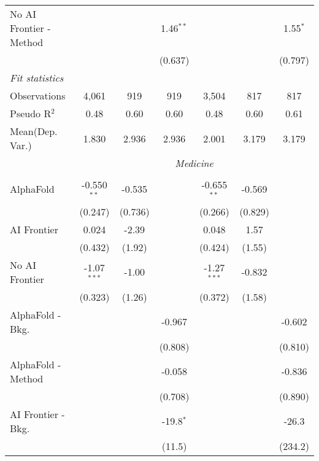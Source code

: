 \begin{tabular}{lcccccc}
   No AI Frontier - Method &               &             & 1.46$^{**}$  &               &             & 1.55$^{*}$\\   
                           &               &             & (0.637)      &               &             & (0.797)\\   
   \midrule
   \emph{Fit statistics}\\
   Observations            & 4,061         & 919         & 919          & 3,504         & 817         & 817\\  
   Pseudo R$^2$            & 0.48          & 0.60        & 0.60         & 0.48          & 0.60        & 0.61\\  
   
Mean(Dep. Var.) & 1.830 & 2.936 & 2.936 & 2.001 & 3.179 & 3.179 \\
 & \multicolumn{6}{c}{\textit{Medicine}} \\ \\
   AlphaFold               & -0.550$^{**}$ & -0.535  &             & -0.655$^{**}$ & -0.569  &   \\   
                           & (0.247)       & (0.736) &             & (0.266)       & (0.829) &   \\   
   AI Frontier             & 0.024         & -2.39   &             & 0.048         & 1.57    &   \\   
                           & (0.432)       & (1.92)  &             & (0.424)       & (1.55)  &   \\   
   No AI Frontier          & -1.07$^{***}$ & -1.00   &             & -1.27$^{***}$ & -0.832  &   \\   
                           & (0.323)       & (1.26)  &             & (0.372)       & (1.58)  &   \\   
   AlphaFold - Bkg.        &               &         & -0.967      &               &         & -0.602\\   
                           &               &         & (0.808)     &               &         & (0.810)\\   
   AlphaFold - Method      &               &         & -0.058      &               &         & -0.836\\   
                           &               &         & (0.708)     &               &         & (0.890)\\   
   AI Frontier - Bkg.      &               &         & -19.8$^{*}$ &               &         & -26.3\\   
                           &               &         & (11.5)      &               &         & (234.2)\\   

\end{tabular}
